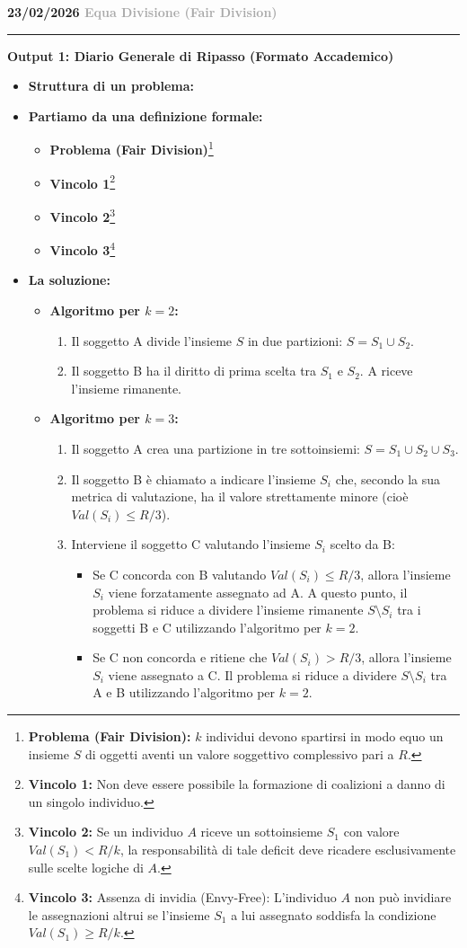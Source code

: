 \documentclass[a4paper, 11pt]{report}
\newcommand{\lezione}[2]{
\vspace{2em}
\noindent\textbf{\Large #1 \hfill \textcolor{darkgray}{#2}}
\vspace{0.5em}
\hrule
\vspace{1.5em}
}
\newcommand{\definizione}[2]{%
\textbf{#1}\footnote{\textbf{#1:} #2}%
}
\begin{document}
\lezione{23/02/2026}{Equa Divisione (Fair Division)}
\vspace{0.5cm}
\textbf{Output 1: Diario Generale di Ripasso (Formato Accademico)}
\begin{itemize}
\item \textbf{Struttura di un problema:}
\item \textbf{Partiamo da una definizione formale:}
\begin{itemize}
\item \definizione{Problema (Fair Division)}{$k$ individui devono spartirsi in modo equo un insieme $S$ di oggetti aventi un valore soggettivo complessivo pari a $R$.}
\item \definizione{Vincolo 1}{Non deve essere possibile la formazione di coalizioni a danno di un singolo individuo.}
\item \definizione{Vincolo 2}{Se un individuo $A$ riceve un sottoinsieme $S_1$ con valore $Val(S_1) < R/k$, la responsabilità di tale deficit deve ricadere esclusivamente sulle scelte logiche di $A$.}
\item \definizione{Vincolo 3}{Assenza di invidia (Envy-Free): L'individuo $A$ non può invidiare le assegnazioni altrui se l'insieme $S_1$ a lui assegnato soddisfa la condizione $Val(S_1) \ge R/k$.}
\end{itemize}
\item \textbf{La soluzione:}
\begin{itemize}
\item \textbf{Algoritmo per $k=2$:}
\begin{enumerate}
\item Il soggetto A divide l'insieme $S$ in due partizioni: $S = S_1 \cup S_2$.
\item Il soggetto B ha il diritto di prima scelta tra $S_1$ e $S_2$. A riceve l'insieme rimanente.
\end{enumerate}
\item \textbf{Algoritmo per $k=3$:}
\begin{enumerate}
\item Il soggetto A crea una partizione in tre sottoinsiemi: $S = S_1 \cup S_2 \cup S_3$.
\item Il soggetto B è chiamato a indicare l'insieme $S_i$ che, secondo la sua metrica di valutazione, ha il valore strettamente minore (cioè $Val(S_i) \le R/3$).
\item Interviene il soggetto C valutando l'insieme $S_i$ scelto da B:
\begin{itemize}
\item Se C concorda con B valutando $Val(S_i) \le R/3$, allora l'insieme $S_i$ viene forzatamente assegnato ad A. A questo punto, il problema si riduce a dividere l'insieme rimanente $S \setminus S_i$ tra i soggetti B e C utilizzando l'algoritmo per $k=2$.
\item Se C non concorda e ritiene che $Val(S_i) > R/3$, allora l'insieme $S_i$ viene assegnato a C. Il problema si riduce a dividere $S \setminus S_i$ tra A e B utilizzando l'algoritmo per $k=2$.
\end{itemize}
\end{enumerate}
\end{itemize}
\end{itemize}
\end{document}
